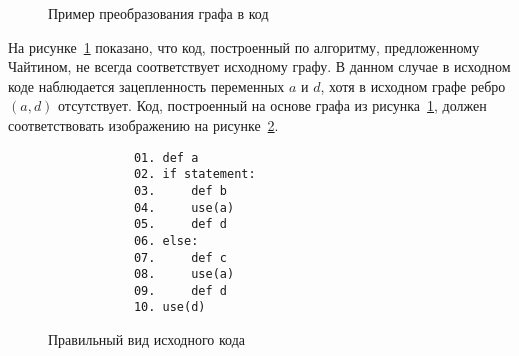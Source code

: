 \begin{example}

    \begin{figure}[h]
        \centering
    \caption{Пример преобразования графа в код}
    \label{fig:ex2}
    \end{figure}

    На рисунке~\ref{fig:ex2} показано, что код, построенный по алгоритму, предложенному Чайтином, не всегда соответствует исходному графу.
    В данном случае в исходном коде наблюдается зацепленность переменных $a$ и $d$, хотя в исходном графе ребро $(a, d)$ отсутствует.
    Код, построенный на основе графа из рисунка~\ref{fig:ex2}, должен соответствовать изображению на рисунке~\ref{fig:right_ex2}.

    \begin{figure}
        \centering
        \lstset{basicstyle=\ttfamily\small, frame=single}
        \begin{lstlisting}
            01. def a
            02. if statement:
            03.     def b
            04.     use(a)
            05.     def d 
            06. else:
            07.     def c
            08.     use(a)
            09.     def d
            10. use(d)
        \end{lstlisting}
        \caption{Правильный вид исходного кода}
        \label{fig:right_ex2}
    \end{figure}
\end{example}

